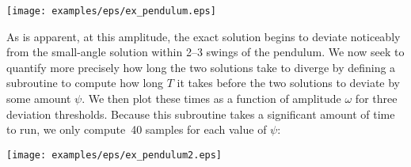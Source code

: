{{\newline
{}
}
\nlscf
\centerline{\texttt{[image: examples/eps/ex\_pendulum.eps]}}
\nlnp
As is apparent, at this amplitude, the exact solution begins to deviate
noticeably from the small-angle solution within 2--3 swings of the pendulum. We
now seek to quantify more precisely how long the two solutions take to diverge
by defining a subroutine to compute how long $T$ it takes before the two
solutions to deviate by some amount $\psi$. We then plot these times as a
function of amplitude $\omega$ for three deviation thresholds. Because this
subroutine takes a significant amount of time to run, we only compute~40
samples for each value of $\psi$:
\nlscf
{\footnotesize
{}\newline
\noindent{\tt \phantom{x}\{}\newline
{}\newline
\noindent{\tt \phantom{xxx}\{}\newline
{}\newline
{}\newline
{}\newline
\noindent{\tt \phantom{xxx}\}}\newline
{}\newline
\noindent{\tt \phantom{x}\}}
}\\{\footnotesize
{}\newline
{}\newline
{}\newline
{}\newline
{}\newline
{}\newline
{}
}
\nlscf
\centerline{\texttt{[image: examples/eps/ex\_pendulum2.eps]}}
}

